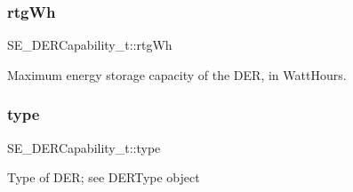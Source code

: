 \subsubsection{\texorpdfstring{rtg\+Wh}{rtgWh}}
{\footnotesize\ttfamily S\+E\+\_\+\+D\+E\+R\+Capability\+\_\+t\+::rtg\+Wh}

Maximum energy storage capacity of the D\+ER, in Watt\+Hours. \mbox{\label{group__DERCapability_ga50fcc4caf19115d8398da27622a972c1}} 
\subsubsection{\texorpdfstring{type}{type}}
{\footnotesize\ttfamily S\+E\+\_\+\+D\+E\+R\+Capability\+\_\+t\+::type}

Type of D\+ER; see D\+E\+R\+Type object 